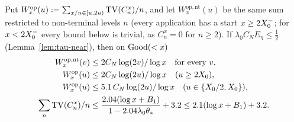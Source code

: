\begin{proposition}\label{prop:true-kernels}
Put $W^{\mathrm{op}}_x(u):=\sum_{x/n\in[u,2u)}\operatorname{TV}(C_n^x)/n$, and let $W^{\mathrm{op,nt}}_x(u)$ be the same sum restricted to
non-terminal levels $n$ (every application has a start $x\ge2X_0^{-}$; for $x<2X_0^{-}$ every bound below is trivial, as $C_n^x=0$ for
$n\ge2$). If $\lambda_0C_NE_\eta\le\frac12$ (Lemma~\ref{lem:tau-near}), then on $\mathrm{Good}(<x)$
\begin{align*}
  W^{\mathrm{op,nt}}_x(v)&\le2C_N\log(2v)/\log x\quad\text{for every }v,\\
  W^{\mathrm{op}}_x(u)&\le2C_N\log(2u)/\log x\quad(u\ge2X_0),\\
  W^{\mathrm{op}}_x(u)&\le5.1\,C_N\log(2u)/\log x\quad(u\in\{X_0/2,X_0\}),\\
  \sum_n\operatorname{TV}(C_n^x)/n&\le\frac{2.04(\log x+B_1)}{1-2.04\lambda_0\theta_*}+3.2\le2.1(\log x+B_1)+3.2 .
\end{align*}
\end{proposition}

